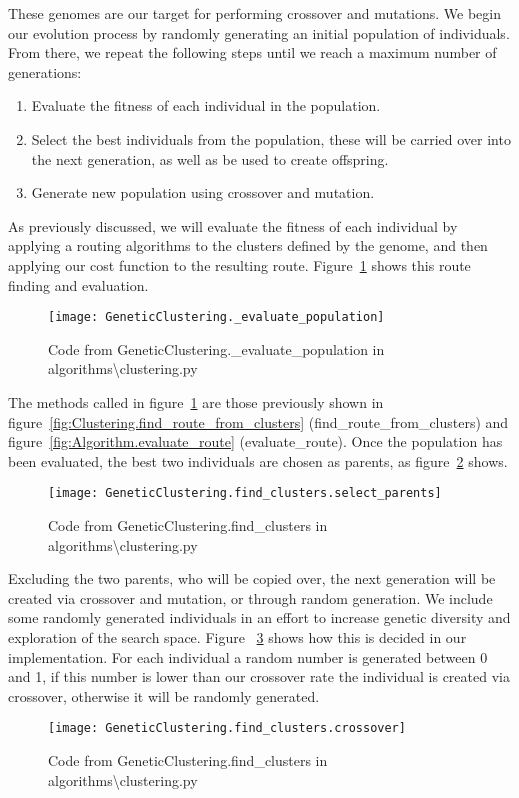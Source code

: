 \noindent
These genomes are our target for performing crossover and mutations.
We begin our evolution process by randomly generating an initial population of individuals.
From there, we repeat the following steps until we reach a maximum number of generations:
\begin{enumerate}
    \item Evaluate the fitness of each individual in the population.
    \item Select the best individuals from the population, these will be carried over into the next generation, as
    well as be used to create offspring.
    \item Generate new population using crossover and mutation.
\end{enumerate}

\noindent
As previously discussed, we will evaluate the fitness of each individual by applying a routing algorithms to the
clusters defined by the genome, and then applying our cost function to the resulting route.
Figure~\ref{fig:GeneticClustering._evaluate_population} shows this route finding and evaluation.
\begin{figure}
    \centering
    \texttt{[image: GeneticClustering.\_evaluate\_population]}
    \caption{Code from GeneticClustering.\_evaluate\_population in algorithms\textbackslash clustering.py}
    \label{fig:GeneticClustering._evaluate_population}
\end{figure}

\noindent
The methods called in figure~\ref{fig:GeneticClustering._evaluate_population} are those previously shown in
figure~\ref{fig:Clustering.find_route_from_clusters} (find_route_from_clusters) and
figure~\ref{fig:Algorithm.evaluate_route} (evaluate_route).
Once the population has been evaluated, the best two individuals are chosen as parents, as figure~\ref{fig:GeneticClustering.find_clusters.select_parents}
shows.
\begin{figure}[H]
    \centering
    \texttt{[image: GeneticClustering.find\_clusters.select\_parents]}
    \caption{Code from GeneticClustering.find\_clusters in algorithms\textbackslash clustering.py}
    \label{fig:GeneticClustering.find_clusters.select_parents}
\end{figure}

\noindent
Excluding the two parents, who will be copied over, the next generation will be created via crossover and mutation,
or through random generation.
We include some randomly generated individuals in an effort to increase genetic diversity and exploration of the
search space.
Figure ~\ref{fig:GeneticClustering.find_clusters.crossover} shows how this is decided in our implementation.
For each individual a random number is generated between 0 and 1, if this number is lower than our crossover rate
the individual is created via crossover, otherwise it will be randomly generated.
\begin{figure}[H]
    \centering
    \texttt{[image: GeneticClustering.find\_clusters.crossover]}
    \caption{Code from GeneticClustering.find\_clusters in algorithms\textbackslash clustering.py}
    \label{fig:GeneticClustering.find_clusters.crossover}
\end{figure}

